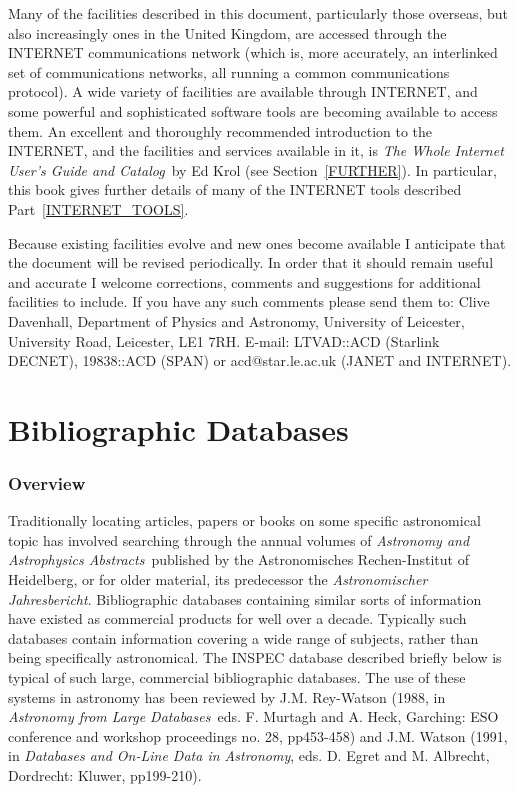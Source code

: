 \documentclass[twoside,11pt,nolof]{starlink}
\begin{document}
Many of the facilities described in this document, particularly those
overseas, but also increasingly ones in the United Kingdom, are accessed
through the INTERNET communications network (which is, more accurately,
an interlinked set of communications networks, all running a common
communications protocol). A wide variety of facilities are available
through INTERNET, and some powerful and sophisticated software tools
are becoming available to access them. An excellent and thoroughly
recommended introduction to the INTERNET, and the facilities and
services available in it, is \textit{The Whole Internet User's Guide and
Catalog}\, by Ed Krol (see Section~\ref{FURTHER}). In particular, this
book gives further details of many of the INTERNET tools described
Part~\ref{INTERNET_TOOLS}.

Because existing facilities evolve and new ones become available I
anticipate that the document will be revised periodically. In order that
it should remain useful and accurate I welcome corrections, comments and
suggestions for additional facilities to include. If you have any such
comments please send them to: Clive Davenhall, Department of Physics and
Astronomy, University of Leicester, University Road, Leicester, LE1 7RH.
E-mail: LTVAD::ACD (Starlink DECNET), 19838::ACD (SPAN) or
acd@star.le.ac.uk (JANET and INTERNET).


\pagebreak
\part{Bibliographic Databases}

\section{Overview}

Traditionally locating articles, papers or books on some specific
astronomical topic has involved searching through the annual volumes
of \textit{Astronomy and Astrophysics Abstracts}\, published by the
Astronomisches Rechen-Institut of Heidelberg, or for older material, its
predecessor the \textit{Astronomischer Jahresbericht}. Bibliographic
databases containing similar sorts of information have existed as
commercial products for well over a decade. Typically such databases
contain information covering a wide range of subjects, rather than
being specifically astronomical. The INSPEC database described
briefly below is typical of such large, commercial bibliographic
databases. The use of these systems in astronomy has been reviewed
by J.M. Rey-Watson (1988, in \textit{Astronomy from Large Databases}\, eds.
F. Murtagh and A. Heck, Garching: ESO conference and workshop
proceedings no. 28, pp453-458) and J.M. Watson (1991, in \textit{Databases and On-Line Data in Astronomy}, eds. D. Egret and M.
Albrecht, Dordrecht: Kluwer, pp199-210).
\end{document}
